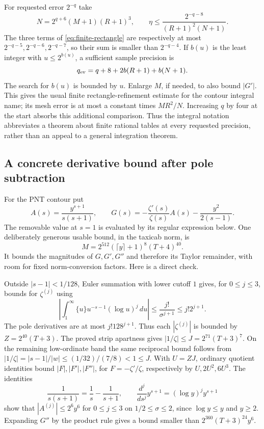 For requested error $2^{-q}$ take
\[
 N=2^{q+6}(M+1)(R+1)^3,
 \qquad
 \eta\le\frac{2^{-q-8}}{(R+1)^2(N+1)}.
\]
The three terms of \eqref{eq:finite-rectangle} are respectively at most
$2^{-q-5},2^{-q-6},2^{-q-7}$, so their sum is smaller than $2^{-q-4}$.
If $b(u)$ is the least integer with $u\le2^{b(u)}$, a sufficient sample
precision is
\[
 q_{\rm ev}=q+8+2b(R+1)+b(N+1).
\]
The search for $b(u)$ is bounded by $u$. Enlarge $M$, if needed, to also bound $|G'|$. This gives the usual
finite rectangle-refinement estimate for the contour integral name; its
mesh error is at most a constant times $MR^2/N$. Increasing $q$ by four
at the start absorbs this additional comparison. Thus the integral
notation abbreviates a theorem about finite rational tables at every
requested precision, rather than an appeal to a general integration
theorem.

\subsection{A concrete derivative bound after pole subtraction}

For the PNT contour put
\[
 A(s)=\frac{y^{s+1}}{s(s+1)},\qquad
 G(s)=-\frac{\zeta'(s)}{\zeta(s)}A(s)-\frac{y^2}{2(s-1)}.
\]
The removable value at $s=1$ is evaluated by its regular expression below.
One deliberately generous usable bound, in the taxicab norm, is
\[
 M=2^{512}(\lceil y\rceil+1)^8(T+4)^{40}.
\]
It bounds the magnitudes of $G,G',G''$ and therefore its Taylor remainder,
with room for fixed norm-conversion factors. Here is a direct check.

Outside $|s-1|<1/128$, Euler summation with lower cutoff $1$ gives,
for $0\le j\le3$, bounds for $\zeta^{(j)}$ using
\[
 \left|\int_1^\infty\{u\}u^{-s-1}(\log u)^j\,du\right|
       \le\frac{j!}{\sigma^{j+1}}\le j!2^{j+1}.
\]
The pole derivatives are at most $j!128^{j+1}$. Thus each
$|\zeta^{(j)}|$ is bounded by $Z=2^{40}(T+3)$.
The proved strip apartness gives
$|1/\zeta|\le J=2^{71}(T+3)^7$. On the remaining low-ordinate band the same reciprocal bound follows from
$|1/\zeta|=|s-1|/|w|\le(1/32)/(7/8)<1\le J$.
With $U=ZJ$, ordinary quotient
identities bound $|F|,|F'|,|F''|$, for $F=-\zeta'/\zeta$, respectively
by $U,2U^2,6U^3$. The identities
\[
 \frac1{s(s+1)}=\frac1s-\frac1{s+1},\qquad
 \frac{d^j}{ds^j}y^{s+1}=(\log y)^j y^{s+1}
\]
show that $|A^{(j)}|\le2^6 y^6$ for $0\le j\le3$ on
$1/2\le\sigma\le2$, since $\log y\le y$ and $y\ge2$.
Expanding $G''$ by the product rule gives a bound smaller than
$2^{360}(T+3)^{24}y^6$.

